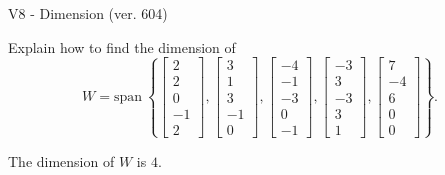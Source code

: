 \begin{exercise}
  \begin{exerciseTitle}V8 - Dimension (ver. 604)\end{exerciseTitle}
  \begin{exerciseStatement}
    Explain how to find the dimension of 
\[W=\mathrm{span}\ \left\{\left[\begin{array}{r}
2 \\
2 \\
0 \\
-1 \\
2
\end{array}\right] , \left[\begin{array}{r}
3 \\
1 \\
3 \\
-1 \\
0
\end{array}\right] , \left[\begin{array}{r}
-4 \\
-1 \\
-3 \\
0 \\
-1
\end{array}\right] , \left[\begin{array}{r}
-3 \\
3 \\
-3 \\
3 \\
1
\end{array}\right] , \left[\begin{array}{r}
7 \\
-4 \\
6 \\
0 \\
0
\end{array}\right]\right\}.\]



  \end{exerciseStatement}
  \begin{exerciseAnswer}
   The dimension of \(W\) is  \(4\).
  


  \end{exerciseAnswer}
\end{exercise}